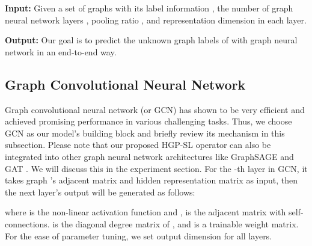 \documentclass[letterpaper]{article} \usepackage{aaai20}  \usepackage{times}  \usepackage{helvet} \usepackage{courier}  \usepackage[hyphens]{url}  \usepackage{graphicx} \urlstyle{rm} \def\UrlFont{\rm}  \usepackage{graphicx}  \frenchspacing  \setlength{\pdfpagewidth}{8.5in}  \setlength{\pdfpageheight}{11in}
\begin{document}
\textbf{Input:}
Given a set of graphs  with its label information , the number of graph neural network layers , pooling ratio , and representation dimension  in each layer.

\textbf{Output:} Our goal is to predict the unknown graph labels of  with graph neural network in an end-to-end way.

\subsection{Graph Convolutional Neural Network}
Graph convolutional neural network (or GCN) \cite{kipf2016semi} has shown to be very efficient and achieved promising performance in various challenging tasks. Thus, we choose GCN as our model's building block and briefly review its mechanism in this subsection. Please note that our proposed HGP-SL operator can also be integrated into other graph neural network architectures like GraphSAGE \cite{hamilton2017inductive} and GAT \cite{velivckovic2017graph}. We will discuss this in the experiment section. For the -th layer in GCN, it takes graph 's adjacent matrix  and hidden representation matrix  as input, then the next layer's output will be generated as follows:

where  is the non-linear activation function and ,  is the adjacent matrix with self-connections.  is the diagonal degree matrix of , and  is a trainable weight matrix. For the ease of parameter tuning, we set output dimension  for all layers.
\end{document}

